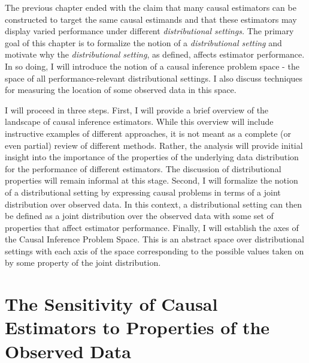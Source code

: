 \documentclass[../main.tex]{subfiles}
\begin{document}
The previous chapter ended with the claim that many causal estimators can be constructed to target the same causal estimands and that these estimators may display varied performance under different \textit{distributional settings.} The primary goal of this chapter is to formalize the notion of a \textit{distributional setting} and motivate why the \textit{distributional setting}, as defined, affects estimator performance. In so doing, I will introduce the notion of a causal inference problem space - the space of all performance-relevant distributional settings. I also discuss techniques for measuring the location of some observed data in this space.\par

\vspace{\baselineskip}

I will proceed in three steps. First, I will provide a brief overview of the landscape of causal inference estimators. While this overview will include instructive examples of different approaches, it is not meant as a complete (or even partial) review of different methods. Rather, the analysis will provide initial insight into the importance of the properties of the underlying data distribution for the performance of different estimators. The discussion of distributional properties will remain informal at this stage. Second, I will formalize the notion of a distributional setting by expressing causal problems in terms of a joint distribution over observed data. In this context, a distributional setting can then be defined as a joint distribution over the observed data with some set of properties that affect estimator performance. Finally, I will establish the axes of the Causal Inference Problem Space. This is an abstract space over distributional settings with each axis of the space corresponding to the possible values taken on by some property of the joint distribution.\par

\section{The Sensitivity of Causal Estimators to Properties of the Observed Data}
\end{document}
